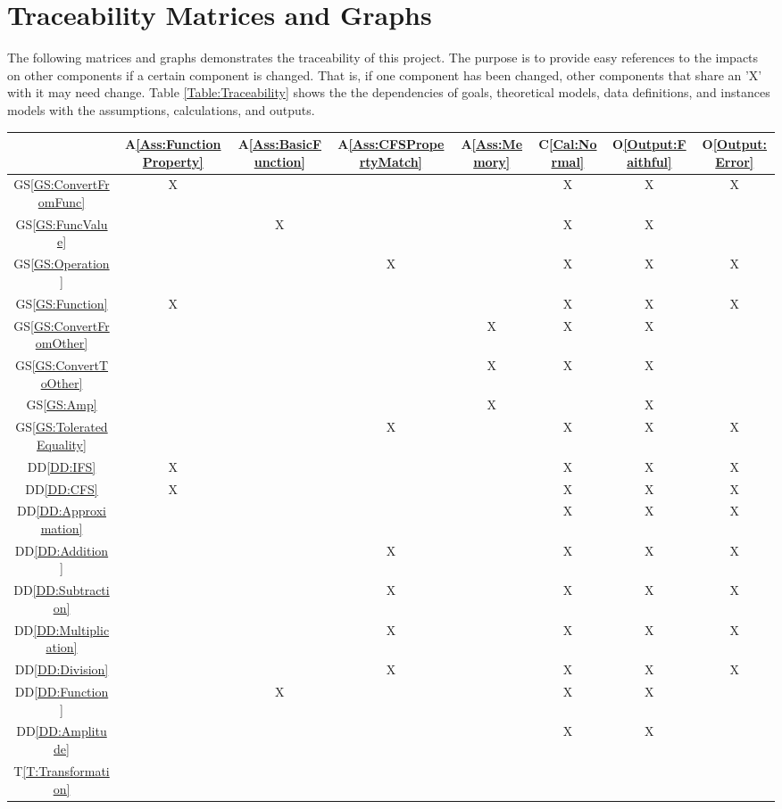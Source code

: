 \documentclass[12pt]{article}
\newcommand{\ddref}[1]{DD\ref{#1}}
\newcommand{\tref}[1]{T\ref{#1}}
\newcommand{\aref}[1]{A\ref{#1}}
\newcommand{\calref}[1]{C\ref{#1}}
\newcommand{\oref}[1]{O\ref{#1}}
\newcommand{\gsref}[1]{GS\ref{#1}}
\begin{document}
\section{Traceability Matrices and Graphs}\label{Sc:Trace}
The following matrices and graphs demonstrates the traceability 
of this project. The purpose is to provide easy references 
to the impacts on other components if a certain component is changed. 
That is, if one component has been changed, other components that share 
an 'X' with it may need change. Table \ref{Table:Traceability} 
shows the the dependencies of goals, theoretical models, 
data definitions, and instances models with the assumptions, 
calculations, and outputs.
\begin{table}
	\centering
	\begin{tabular}{|c|c|c|c|c|c|c|c|}
		\hline
		&\aref{Ass:FunctionProperty}&\aref{Ass:BasicFunction}
		&\aref{Ass:CFSPropertyMatch}&\aref{Ass:Memory}
		&\calref{Cal:Normal}&\oref{Output:Faithful}
		&\oref{Output:Error}\\
		\hline
		\gsref{GS:ConvertFromFunc}
		&X& & & &X&X&X\\\hline
		\gsref{GS:FuncValue}
		& &X& & &X&X& \\\hline
		\gsref{GS:Operation}
		& & &X& &X&X&X \\\hline
		\gsref{GS:Function}
		&X& & & &X&X&X\\\hline
		\gsref{GS:ConvertFromOther}
		& & & &X&X&X& \\\hline
		\gsref{GS:ConvertToOther}
		& & & &X&X&X& \\\hline
		\gsref{GS:Amp}
		& & & &X& &X& \\\hline
		\gsref{GS:ToleratedEquality}
		& & &X& &X&X&X\\\hline
		\ddref{DD:IFS}
		&X& & & &X&X&X\\\hline
		\ddref{DD:CFS}
		&X& & & &X&X&X\\\hline
		\ddref{DD:Approximation}
		& & & & &X&X&X\\\hline
		\ddref{DD:Addition}
		& & &X& &X&X&X\\\hline
		\ddref{DD:Subtraction}
		& & &X& &X&X&X\\\hline
		\ddref{DD:Multiplication}
		& & &X& &X&X&X\\\hline
		\ddref{DD:Division}
		& & &X& &X&X&X\\\hline
		\ddref{DD:Function}
		& &X& & &X&X& \\\hline
		\ddref{DD:Amplitude}
		& & & & &X&X& \\\hline
		\tref{T:Transformation}

\end{tabular}
\end{table}
\end{document}
